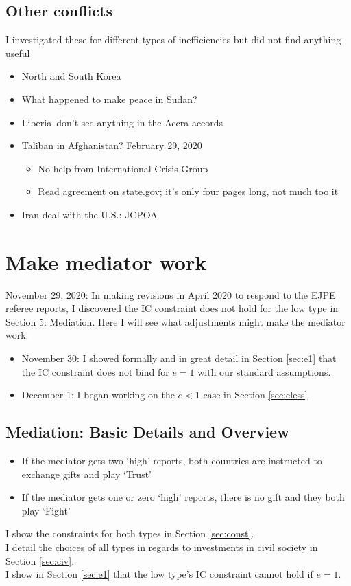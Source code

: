 \documentclass[12pt]{article}
\begin{document}
\subsection{Other conflicts}
I investigated these for different types of inefficiencies but did not find anything useful
\begin{itemize}	
	\item North and South Korea
	\item What happened to make peace in Sudan?
	\item Liberia--don't see anything in the Accra accords
	\item Taliban in Afghanistan? February 29, 2020
		\begin{itemize}
			\item No help from International Crisis Group
			\item Read agreement on state.gov; it's only four pages long, not much too it
		\end{itemize}
	\item Iran deal with the U.S.: JCPOA
\end{itemize}

\section{Make mediator work}
November 29, 2020: In making revisions in April 2020 to respond to the EJPE referee reports, I discovered the IC constraint does not hold for the low type in Section 5: Mediation. Here I will see what adjustments might make the mediator work.
\begin{itemize}
	\item November 30: I showed formally and in great detail in Section \ref{sec:e1} that the IC constraint does not bind for $e=1$ with our standard assumptions.
	\item December 1: I began working on the $e < 1$ case in Section \ref{sec:eless}
\end{itemize}

\subsection{Mediation: Basic Details and Overview}
\begin{itemize}
	\item If the mediator gets two `high' reports, both countries are instructed to exchange gifts and play `Trust'
	\item If the mediator gets one or zero `high' reports, there is no gift and they both play `Fight'
\end{itemize}
I show the constraints for both types in Section \ref{sec:const}.\\
I detail the choices of all types in regards to investments in civil society in Section \ref{sec:civ}.\\
I show in Section \ref{sec:e1} that the low type's IC constraint cannot hold if $e=1$.\\
\end{document}
